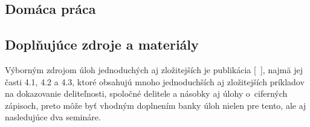 



















\subsection*{Domáca práca}






\subsection*{Doplňujúce zdroje a materiály}
Výborným zdrojom úloh jednoduchých aj zložitejších je publikácia [~\cite{holton2010}], najmä jej časti 4.1, 4.2 a 4.3, ktoré obsahujú mnoho jednoduchších aj zložitejších príkladov na dokazovanie deliteľnosti, spoločné delitele a násobky aj úlohy o~ciferných zápisoch, preto môže byť vhodným doplnením banky úloh nielen pre tento, ale aj nasledujúce dva semináre.

